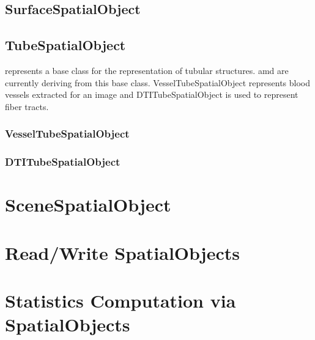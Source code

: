 \subsection{SurfaceSpatialObject}
\label{sec:SurfaceSpatialObject}
\ifitkFullVersion 

\fi

\subsection{TubeSpatialObject}

 represents a base class for the representation
of tubular structures.  amd 
 are currently deriving from this base class.
VesselTubeSpatialObject represents blood vessels extracted for an image and 
DTITubeSpatialObject is used to represent fiber tracts.

\label{sec:TubeSpatialObject}
\ifitkFullVersion 

\fi

\subsubsection{VesselTubeSpatialObject}
\label{sec:VesselTubeSpatialObject}
\ifitkFullVersion 

\fi

\subsubsection{DTITubeSpatialObject}
\label{sec:DTITubeSpatialObject}
\ifitkFullVersion 

\fi

\section{SceneSpatialObject}
\label{sec:Scene}
\ifitkFullVersion 

\fi

\section{Read/Write SpatialObjects}
\label{sec:ReadWriteSpatialObjects}
\ifitkFullVersion 

\fi

\section{Statistics Computation via SpatialObjects}
\label{sec:SpatialObjectToImageStatisticsCalculator}
\ifitkFullVersion 

\fi